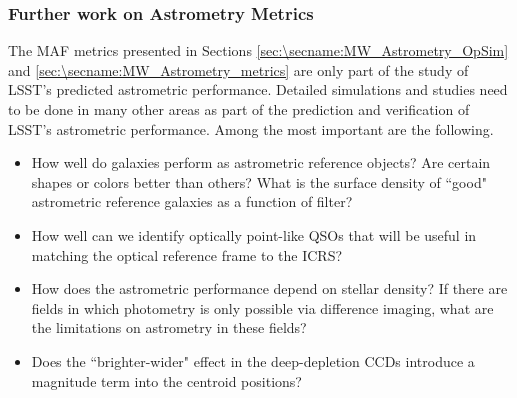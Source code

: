 \subsubsection{Further work on Astrometry Metrics}

The MAF metrics presented in Sections \ref{sec:\secname:MW_Astrometry_OpSim} and \ref{sec:\secname:MW_Astrometry_metrics} are only part of the
study of LSST's predicted astrometric performance.  Detailed simulations
and studies need to be done in many other areas as part of the
prediction and verification of LSST's astrometric performance.  Among
the most important are the following.
\begin{itemize}
\item How well do galaxies perform as astrometric reference objects? Are certain shapes or colors better than others? What is the 
surface density of ``good" astrometric reference galaxies as a function of filter? 
\item How well can we identify optically point-like QSOs that will be useful in matching the optical reference frame to the ICRS?
\item How does the astrometric performance depend on stellar density? If there are fields in which photometry is only possible via difference imaging, what are the limitations
on astrometry in these fields?
\item Does the ``brighter-wider" effect in the deep-depletion CCDs introduce a magnitude term into the centroid positions?
\end{itemize}

\navigationbar

